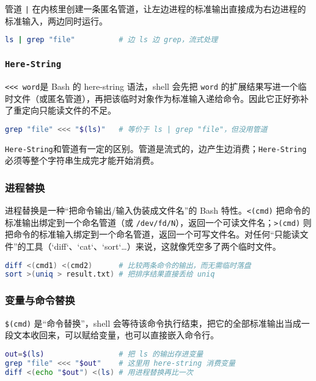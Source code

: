 \documentclass[../main.tex]{subfiles}
\begin{document}
管道 \texttt{|} 在内核里创建一条匿名管道，让左边进程的标准输出直接成为右边进程的标准输入，两边同时运行。

\begin{lstlisting}[language=bash]
ls | grep "file"          # 边 ls 边 grep，流式处理
\end{lstlisting}

\subsubsection{\texttt{Here-String}}

\texttt{<<< word}是 Bash 的 here-string 语法，shell 会先把 \texttt{word} 的扩展结果写进一个临时文件（或匿名管道），再把该临时对象作为标准输入递给命令。因此它正好弥补了重定向只能读文件的不足。

\begin{lstlisting}[language=bash]
grep "file" <<< "$(ls)"   # 等价于 ls | grep "file"，但没用管道
\end{lstlisting}

\texttt{Here-String}和管道有一定的区别。管道是流式的，边产生边消费；\texttt{Here-String}必须等整个字符串生成完才能开始消费。

\subsubsection{进程替换}

进程替换是一种“把命令输出/输入伪装成文件名”的 Bash 特性。\texttt{<(cmd)} 把命令的标准输出绑定到一个命名管道（或 \texttt{/dev/fd/N}），返回一个可读文件名；\texttt{>(cmd)} 则把命令的标准输入绑定到一个命名管道，返回一个可写文件名。对任何“只能读文件”的工具（`diff`、`cat`、`sort`…）来说，这就像凭空多了两个临时文件。

\begin{lstlisting}[language=bash]
diff <(cmd1) <(cmd2)      # 比较两条命令的输出，而无需临时落盘
sort >(uniq > result.txt) # 把排序结果直接丢给 uniq
\end{lstlisting}

\subsubsection*{变量与命令替换}

\texttt{\$(cmd)} 是“命令替换”，shell 会等待该命令执行结束，把它的全部标准输出当成一段文本收回来，可以赋给变量，也可以直接嵌入命令行。

\begin{lstlisting}[language=bash]
out=$(ls)                 # 把 ls 的输出存进变量
grep "file" <<< "$out"    # 这里用 here-string 消费变量
diff <(echo "$out") <(ls) # 用进程替换再比一次
\end{lstlisting}
\end{document}
